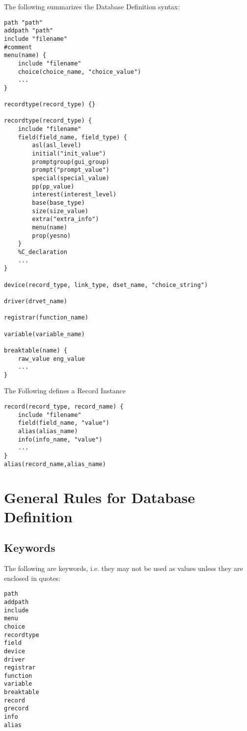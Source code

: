 The following summarizes the Database Definition syntax:

\begin{lstlisting}[language=dbd]
path "path"
addpath "path"
include "filename"
#comment
menu(name) {
    include "filename"
    choice(choice_name, "choice_value")
    ...
}

recordtype(record_type) {}

recordtype(record_type) {
    include "filename"
    field(field_name, field_type) {
        asl(asl_level)
        initial("init_value")
        promptgroup(gui_group)
        prompt("prompt_value")
        special(special_value)
        pp(pp_value)
        interest(interest_level)
        base(base_type)
        size(size_value)
        extra("extra_info")
        menu(name)
        prop(yesno)
    }
    %C_declaration
    ...
}

device(record_type, link_type, dset_name, "choice_string")

driver(drvet_name)

registrar(function_name)

variable(variable_name)

breaktable(name) {
    raw_value eng_value
    ...
}
\end{lstlisting}

The Following defines a Record Instance

\begin{lstlisting}[language=dbd]
record(record_type, record_name) {
    include "filename"
    field(field_name, "value")
    alias(alias_name)
    info(info_name, "value")
    ...
}
alias(record_name,alias_name)
\end{lstlisting}

\section{General Rules for Database Definition}

\subsection{Keywords}

The following are keywords, i.e. they may not be used as values unless they are enclosed in quotes:

\begin{lstlisting}[language=dbd]
path
addpath
include
menu
choice
recordtype
field
device
driver
registrar
function
variable
breaktable
record
grecord
info
alias
\end{lstlisting}

